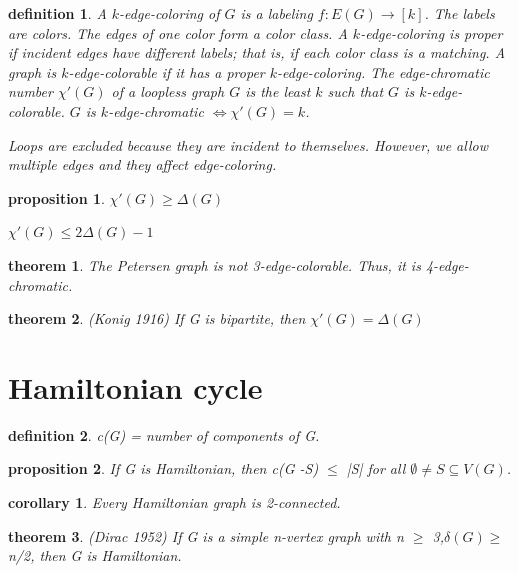 \documentclass[twocolumn]{article}
\newtheorem{theorem}{theorem}[section]  %
\newtheorem{definition}{definition}
\newtheorem{proposition}{proposition}
\newtheorem{corollary}{corollary}
\begin{document}
\begin{CJK*}{UTF8}{bkai}
    \begin{definition}
        A \(k\)-edge-coloring of \(G\) is a labeling \(f : E(G) \to [k]\). The labels are colors. The 
edges of one color form a color class. A \(k\)-edge-coloring is proper if incident 
edges have different labels; that is, if each color class is a matching. A graph is 
\(k\)-edge-colorable if it has a proper \(k\)-edge-coloring. The edge-chromatic 
number \(\chi'(G)\) of a loopless graph \(G\) is the least \(k\) such that \(G\) is \(k\)-edge-colorable. \(G\) 
is \(k\)-edge-chromatic \(\iff \chi'(G) = k\).

Loops are excluded because they are incident to themselves. 
However, we allow multiple edges and they affect edge-coloring.

    \end{definition}

    \begin{proposition}
        $\chi'(G) \geq \Delta(G)$

        $\chi'(G) \leq 2 \Delta(G)-1$
    \end{proposition}

    \begin{theorem}
        The Petersen graph is not 3-edge-colorable. Thus, it is 4-edge-chromatic.
    \end{theorem}

    \begin{theorem}{(Konig 1916)}
         If G is bipartite, then $\chi'(G) = \Delta(G)$
    \end{theorem}

\section{Hamiltonian cycle}

    \begin{definition}
        c(G) =  number of components of G.
    \end{definition}

    \begin{proposition}
         If G is Hamiltonian, then c(G -S) $\leq$ |S| for all $\emptyset \neq  S \subseteq  V(G)$.
    \end{proposition}

    \begin{corollary}
        Every Hamiltonian graph is 2-connected.
    \end{corollary}

    \begin{theorem}{(Dirac 1952)}
        If G is a simple n-vertex graph with n $\geq$ 3,$\delta(G) \geq$ n/2, then G is Hamiltonian.
    \end{theorem}


\end{CJK*}
\end{document}
